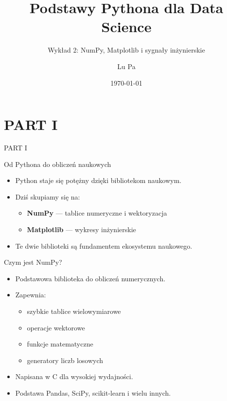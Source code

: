 \documentclass[aspectratio=169]{beamer}
\title{Podstawy Pythona dla Data Science}
\subtitle{Wykład 2: NumPy, Matplotlib i sygnały inżynierskie}
\author{Lu Pa}
\date{\today}
\begin{document}
\begin{frame}
  \titlepage
\end{frame}

\section{PART I}
\begin{frame}[plain]
  \begin{center}
    \vspace{2cm}
    {\color{white}\Huge PART I}
  \end{center}
\end{frame}

\begin{frame}{Od Pythona do obliczeń naukowych}
  \begin{itemize}
    \item Python staje się potężny dzięki bibliotekom naukowym.
    \item Dziś skupiamy się na:
      \begin{itemize}
        \item \textbf{NumPy} — tablice numeryczne i wektoryzacja
        \item \textbf{Matplotlib} — wykresy inżynierskie
      \end{itemize}
    \item Te dwie biblioteki są fundamentem ekosystemu naukowego.
  \end{itemize}
\end{frame}

\begin{frame}{Czym jest NumPy?}
  \begin{itemize}
    \item Podstawowa biblioteka do obliczeń numerycznych.
    \item Zapewnia:
      \begin{itemize}
        \item szybkie tablice wielowymiarowe
        \item operacje wektorowe
        \item funkcje matematyczne
        \item generatory liczb losowych
      \end{itemize}
    \item Napisana w C dla wysokiej wydajności.
    \item Podstawa Pandas, SciPy, scikit-learn i wielu innych.
  \end{itemize}
\end{frame}
\end{document}
